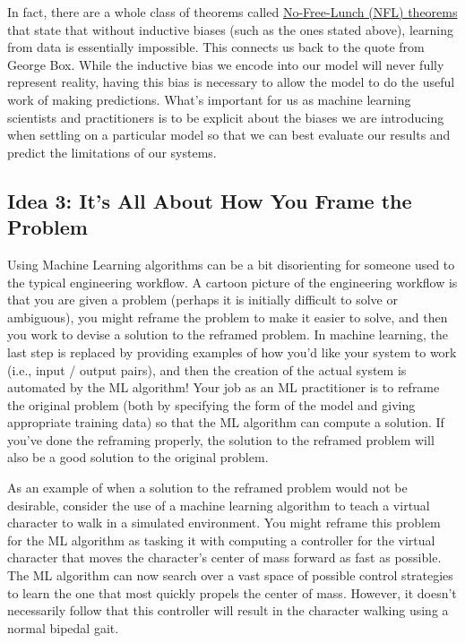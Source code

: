 \documentclass[assignment01_Solutions]{subfiles}
\begin{document}
In fact, there are a whole class of theorems called \href{https://en.wikipedia.org/wiki/No_free_lunch_theorem}{No-Free-Lunch (NFL) theorems} that state that without inductive biases (such as the ones stated above), learning from data is essentially impossible.  This connects us back to the quote from George Box.  While the inductive bias we encode into our model will never fully represent reality, having this bias is necessary to allow the model to do the useful work of making predictions.  What's important for us as machine learning scientists and practitioners is to be explicit about the biases we are introducing when settling on a particular model so that we can best evaluate our results and predict the limitations of our systems.

\subsection*{Idea 3: It's All About How You Frame the Problem}

Using Machine Learning algorithms can be a bit disorienting for someone used to the typical engineering workflow.  A cartoon picture of the engineering workflow is that you are given a problem (perhaps it is initially difficult to solve or ambiguous), you might reframe the problem to make it easier to solve, and then you work to devise a solution to the reframed problem.  In machine learning, the last step is replaced by providing examples of how you'd like your system to work (i.e., input / output pairs), and then the creation of the actual system is automated by the ML algorithm!  Your job as an ML practitioner is to reframe the original problem (both by specifying the form of the model and giving appropriate training data) so that the ML algorithm can compute a solution.  If you've done the reframing properly, the solution to the reframed problem will also be a good solution to the original problem.

As an example of when a solution to the reframed problem would not be desirable, consider the use of a machine learning algorithm to teach a virtual character to walk in a simulated environment.  You might reframe this problem for the ML algorithm as tasking it with computing a controller for the virtual character that moves the character's center of mass forward as fast as possible.  The ML algorithm can now search over a vast space of possible control strategies to learn the one that most quickly propels the center of mass.  However, it doesn't necessarily follow that this controller will result in the character walking using a normal bipedal gait.
\end{document}
